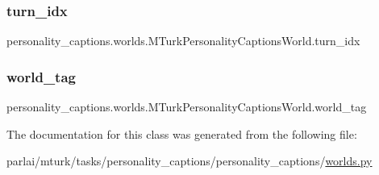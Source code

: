 \subsubsection{\texorpdfstring{turn\+\_\+idx}{turn\_idx}}
{\footnotesize\ttfamily personality\+\_\+captions.\+worlds.\+M\+Turk\+Personality\+Captions\+World.\+turn\+\_\+idx}

\mbox{\label{classpersonality__captions_1_1worlds_1_1MTurkPersonalityCaptionsWorld_ac344f28e6b5ef9bdf42428795054418d}} 
\subsubsection{\texorpdfstring{world\+\_\+tag}{world\_tag}}
{\footnotesize\ttfamily personality\+\_\+captions.\+worlds.\+M\+Turk\+Personality\+Captions\+World.\+world\+\_\+tag}



The documentation for this class was generated from the following file\+:\begin{DoxyCompactItemize}
\item 
parlai/mturk/tasks/personality\+\_\+captions/personality\+\_\+captions/\hyperlink{parlai_2mturk_2tasks_2personality__captions_2personality__captions_2worlds_8py}{worlds.\+py}\end{DoxyCompactItemize}
